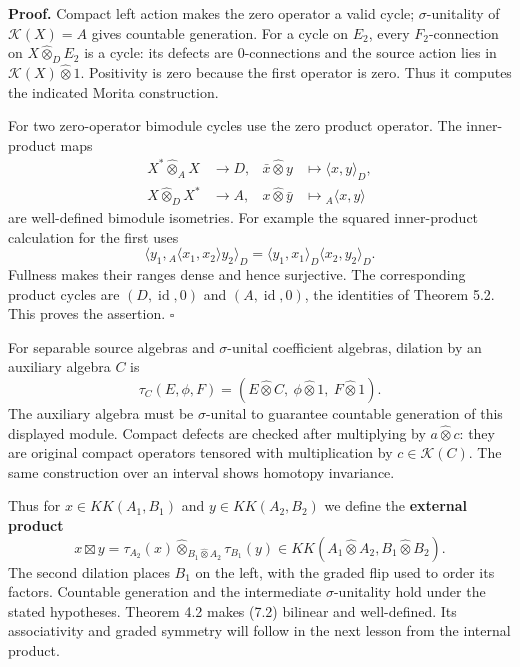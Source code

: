 \documentclass[
  11pt,
]{article}
\begin{document}
\textbf{Proof.} Compact left action makes the zero operator a valid
cycle; \(\sigma\)-unitality of \(\mathcal K(X)=A\) gives countable
generation. For a cycle on \(E_2\), every \(F_2\)-connection on
\(X\widehat\otimes_D E_2\) is a cycle: its defects are \(0\)-connections
and the source action lies in \(\mathcal K(X)\widehat\otimes1\).
Positivity is zero because the first operator is zero. Thus it computes
the indicated Morita construction.

For two zero-operator bimodule cycles use the zero product operator. The
inner-product maps \[
\begin{aligned}
X^*\widehat\otimes_A X&\longrightarrow D,
&\bar x\widehat\otimes y&\longmapsto\langle x,y\rangle_D,\\
X\widehat\otimes_D X^*&\longrightarrow A,
&x\widehat\otimes\bar y&\longmapsto{}_A\langle x,y\rangle
\end{aligned}
\tag{7.1}
\] are well-defined bimodule isometries. For example the squared
inner-product calculation for the first uses \[
\langle y_1,{}_A\langle x_1,x_2\rangle y_2\rangle_D
=\langle y_1,x_1\rangle_D\langle x_2,y_2\rangle_D.
\] Fullness makes their ranges dense and hence surjective. The
corresponding product cycles are \((D,\operatorname{id},0)\) and
\((A,\operatorname{id},0)\), the identities of Theorem 5.2. This proves
the assertion. \(\square\)

For separable source algebras and \(\sigma\)-unital coefficient
algebras, dilation by an auxiliary algebra \(C\) is \[
\tau_C(E,\phi,F)
=(E\widehat\otimes C,\ \phi\widehat\otimes1,\
F\widehat\otimes1).
\] The auxiliary algebra must be \(\sigma\)-unital to guarantee
countable generation of this displayed module. Compact defects are
checked after multiplying by \(a\widehat\otimes c\): they are original
compact operators tensored with multiplication by \(c\in\mathcal K(C)\).
The same construction over an interval shows homotopy invariance.

Thus for \(x\in KK(A_1,B_1)\) and \(y\in KK(A_2,B_2)\) we define the
\textbf{external product} \[
x\boxtimes y
=\tau_{A_2}(x)\widehat\otimes_{B_1\widehat\otimes A_2}
\tau_{B_1}(y)
\in KK(A_1\widehat\otimes A_2,B_1\widehat\otimes B_2).
\tag{7.2}
\] The second dilation places \(B_1\) on the left, with the graded flip
used to order its factors. Countable generation and the intermediate
\(\sigma\)-unitality hold under the stated hypotheses. Theorem 4.2 makes
(7.2) bilinear and well-defined. Its associativity and graded symmetry
will follow in the next lesson from the internal product.
\end{document}
